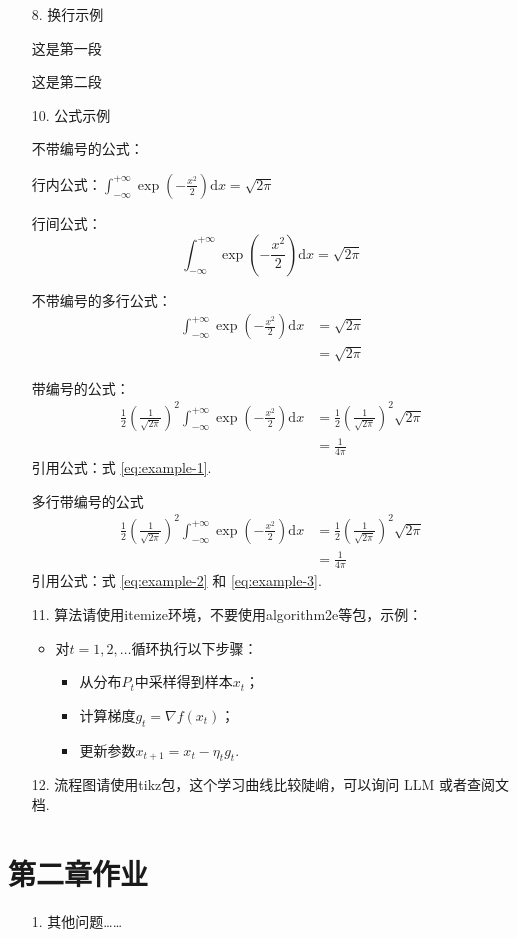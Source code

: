 \documentclass{ctexart}
\renewcommand{\d}{\mathrm{d}}
\begin{document}
\begin{enumerate}[wide, labelindent=0pt]
\item[8.] 换行示例

这是第一段

这是第二段

\item[10.] 公式示例

不带编号的公式：

行内公式：$\int_{-\infty}^{+\infty} \exp\left( -\frac{x^2}{2} \right) \d x = \sqrt{2\pi}$

行间公式：
\[
    \int_{-\infty}^{+\infty} \exp\left( -\frac{x^2}{2} \right) \d x = \sqrt{2\pi}
\]

不带编号的多行公式：
\begin{align*}
    \int_{-\infty}^{+\infty} \exp\left( -\frac{x^2}{2} \right) \d x
    &= \sqrt{2\pi} \\
    &= \sqrt{2\pi}
\end{align*}

带编号的公式：
\begin{equation}
    \begin{aligned}
        \frac{1}{2} \left( \frac{1}{\sqrt{2\pi}} \right)^2 \int_{-\infty}^{+\infty} \exp\left( -\frac{x^2}{2} \right) \d x
        &= \frac{1}{2} \left( \frac{1}{\sqrt{2\pi}} \right)^2 \sqrt{2\pi} \\
        &= \frac{1}{4\pi}
    \end{aligned}\label{eq:example-1}
\end{equation}
引用公式：式 \eqref{eq:example-1}. 

多行带编号的公式
\begin{align}
    \frac{1}{2} \left( \frac{1}{\sqrt{2\pi}} \right)^2 \int_{-\infty}^{+\infty} \exp\left( -\frac{x^2}{2} \right) \d x
    &= \frac{1}{2} \left( \frac{1}{\sqrt{2\pi}} \right)^2 \sqrt{2\pi} \label{eq:example-2} \\
        &= \frac{1}{4\pi} \label{eq:example-3}
\end{align}
引用公式：式 \eqref{eq:example-2} 和 \eqref{eq:example-3}. 

\item[11.] 算法请使用itemize环境，不要使用algorithm2e等包，示例：

\begin{itemize}
    \item 对$t=1,2,\ldots$循环执行以下步骤：
    \begin{itemize}
        \item 从分布$P_t$中采样得到样本$x_t$；
        \item 计算梯度$g_t=\nabla f(x_t)$；
        \item 更新参数$x_{t+1}=x_t-\eta_t g_t$. 
    \end{itemize}
\end{itemize}

\item[12.] 流程图请使用tikz包，这个学习曲线比较陡峭，可以询问 LLM 或者查阅文档. 
\end{enumerate}

\section{第二章作业}

\begin{enumerate}[wide, labelindent=0pt]
\item[1.] 其他问题……
\end{enumerate}
\end{document}
